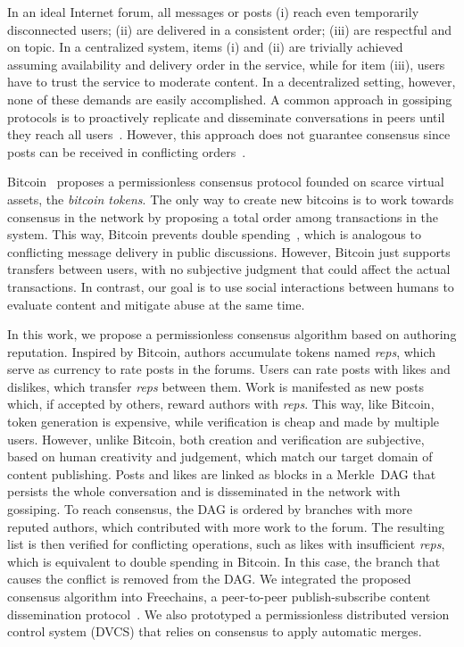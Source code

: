 \documentclass[10pt,journal,compsoc]{IEEEtran}
\newcommand{\reps}     {\emph{reps}\xspace}
\begin{document}
In an ideal Internet forum, all messages or posts
(i)   reach even temporarily disconnected users;
(ii)  are delivered in a consistent order;
(iii) are respectful and on topic.
In a centralized system, items (i) and (ii) are trivially achieved assuming
availability and delivery order in the service, while for item (iii), users
have to trust the service to moderate content.
In a decentralized setting, however, none of these demands are easily
accomplished.
A common approach in gossiping protocols is to proactively replicate and
disseminate conversations in peers until they reach all
users~\cite{p2p.survey}.
However, this approach does not guarantee consensus since posts can be received
in conflicting orders~\cite{p2p.intention}.

Bitcoin~\cite{p2p.bitcoin} proposes a permissionless consensus protocol founded
on scarce virtual assets, the \emph{bitcoin tokens}.
%
The only way to create new bitcoins is to work towards consensus in the network
by proposing a total order among transactions in the system.
%
This way, Bitcoin prevents double spending~\cite{p2p.bitcoin}, which is
analogous to conflicting message delivery in public discussions.
%
However, Bitcoin just supports transfers between users, with no subjective
judgment that could affect the actual transactions.
In contrast, our goal is to use social interactions between humans to evaluate
content and mitigate abuse at the same time.

In this work, we propose a permissionless consensus algorithm based on
authoring reputation.
Inspired by Bitcoin, authors accumulate tokens named \reps, which serve as
currency to rate posts in the forums.
Users can rate posts with likes and dislikes, which transfer \reps between
them.
Work is manifested as new posts which, if accepted by others, reward authors
with \reps.
This way, like Bitcoin, token generation is expensive, while verification is
cheap and made by multiple users.
However, unlike Bitcoin, both creation and verification are subjective, based
on human creativity and judgement, which match our target domain of content
publishing.
Posts and likes are linked as blocks in a Merkle~DAG that persists the whole
conversation and is disseminated in the network with gossiping.
To reach consensus, the DAG is ordered by branches with more reputed authors,
which contributed with more work to the forum.
The resulting list is then verified for conflicting operations, such as likes
with insufficient \reps, which is equivalent to double spending in Bitcoin.
In this case, the branch that causes the conflict is removed from the DAG.
%
We integrated the proposed consensus algorithm into Freechains, a peer-to-peer
publish-subscribe content dissemination protocol~\cite{fcs.sbseg20}.
We also prototyped a permissionless distributed version control system (DVCS)
that relies on consensus to apply automatic merges.
\end{document}
